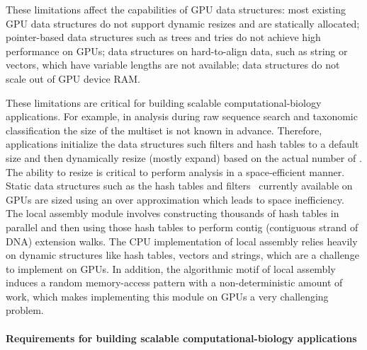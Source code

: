 These limitations affect the capabilities of GPU data structures: most existing GPU data structures do not support dynamic resizes and are statically allocated; pointer-based data structures such as trees and tries do not achieve high performance on GPUs; data structures on hard-to-align data, such as string or vectors, which have variable lengths are not available; data structures do not scale out of GPU device RAM.

These limitations are critical for building scalable computational-biology applications. For example, in \kmer analysis during raw sequence search and taxonomic classification the size of the \kmer multiset is not known in advance. Therefore, applications initialize the data structures such filters and hash tables to a default size and then dynamically resize (mostly expand) based on the actual number of \kmers. The ability to resize is critical to perform \kmer analysis in a space-efficient manner. Static data structures such as the hash tables and filters~\cite{xxx} currently available on GPUs are sized using an over approximation which leads to space inefficiency.
The local assembly module involves constructing thousands of hash tables in parallel and then using those hash tables to
perform contig (contiguous strand of DNA) extension walks. The
CPU implementation of local assembly relies heavily on dynamic
structures like hash tables, vectors and strings, which are a challenge to implement on GPUs. In addition, the algorithmic motif
of local assembly induces a random memory-access pattern with a non-deterministic amount of work, which makes implementing
this module on GPUs a very challenging problem.






\paragraph{Requirements for building scalable computational-biology applications}

